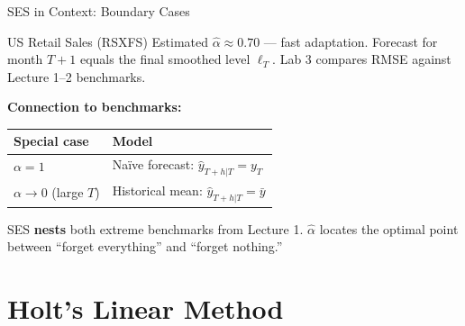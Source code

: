 \documentclass[aspectratio=169, 11pt]{beamer}
\begin{document}
\begin{frame}{SES in Context: Boundary Cases}
  \begin{examplebox}{US Retail Sales (RSXFS)}
    {\small Estimated $\hat{\alpha} \approx 0.70$ --- fast adaptation.
    Forecast for month $T{+}1$ equals the final smoothed level $\ell_T$.
    Lab 3 compares RMSE against Lecture 1--2 benchmarks.}
  \end{examplebox}
  \vspace{0.2cm}
  \textbf{Connection to benchmarks:}
  \begin{center}
    \begin{tabular}{ll}
      \toprule
      \textbf{Special case} & \textbf{Model} \\
      \midrule
      $\alpha = 1$ & Na\"{i}ve forecast: $\hat{y}_{T+h|T} = y_T$ \\
      $\alpha \to 0$ (large $T$) & Historical mean: $\hat{y}_{T+h|T} = \bar{y}$ \\
      \bottomrule
    \end{tabular}
  \end{center}
  \begin{keybox}
    SES \textbf{nests} both extreme benchmarks from Lecture 1.
    $\hat{\alpha}$ locates the optimal point between ``forget everything''
    and ``forget nothing.''
  \end{keybox}
\end{frame}

\section{Holt's Linear Method}

\end{document}

